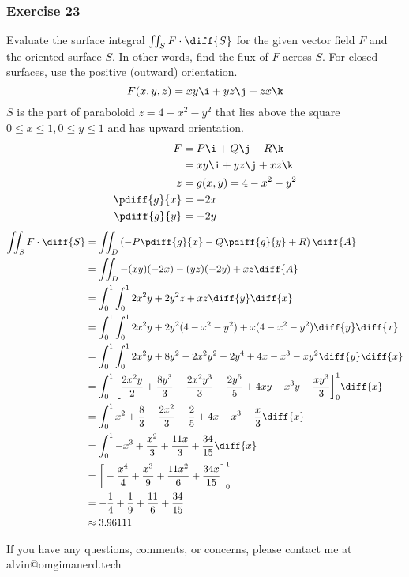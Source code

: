 \documentclass{math}
\begin{document}
\subsubsection*{Exercise 23}
Evaluate the surface integral \( \iint_{S}F\cdot\diff{S} \) for the given vector
field \( F \) and the oriented surface \( S \). In other words, find the flux of
\( F \) across \( S \). For closed surfaces, use the positive (outward)
orientation.
\[ F(x,y,z) = xy\i+yz\j+zx\k \]
\( S \) is the part of paraboloid \( z = 4-x^2-y^2 \) that lies above the square
\( 0\le x\le1,0\le y\le1 \) and has upward orientation.
\begin{align*}
  F &= P\i+Q\j+R\k \\
  &= xy\i+yz\j+xz\k \\
  z &= g(x,y) = 4-x^2-y^2 \\
  \pdiff{g}{x} &= -2x \\
  \pdiff{g}{y} &= -2y
\end{align*}
\begin{align*}
  \iint_{S}F\cdot\diff{S} &=
    \iint_{D}\left(-P\pdiff{g}{x}-Q\pdiff{g}{y}+R\right)\diff{A} \\
  &= \iint_{D}-(xy)(-2x)-(yz)(-2y)+xz\diff{A} \\
  &= \int_{0}^{1}\int_{0}^{1}2x^2y+2y^2z+xz\diff{y}\diff{x} \\
  &= \int_{0}^{1}\int_{0}^{1}2x^2y+2y^2(4-x^2-y^2)+x(4-x^2-y^2)
    \diff{y}\diff{x} \\
  &= \int_{0}^{1}\int_{0}^{1}2x^2y+8y^2-2x^2y^2-2y^4+4x-x^3-xy^2
    \diff{y}\diff{x} \\
  &= \int_{0}^{1}\bigg[\frac{2x^2y}{2}+\frac{8y^3}{3}-\frac{2x^2y^3}{3}-
    \frac{2y^5}{5}+4xy-x^3y-\frac{xy^3}{3}\bigg]_{0}^{1}\diff{x} \\
  &= \int_{0}^{1}x^2+\frac{8}{3}-\frac{2x^2}{3}-\frac{2}{5}+4x-x^3-\frac{x}{3}
    \diff{x} \\
  &= \int_{0}^{1}-x^3+\frac{x^2}{3}+\frac{11x}{3}+\frac{34}{15}\diff{x} \\
  &= \bigg[-\frac{x^4}{4}+\frac{x^3}{9}+\frac{11x^2}{6}+\frac{34x}{15}
    \bigg]_{0}^{1} \\
  &= -\frac{1}{4}+\frac{1}{9}+\frac{11}{6}+\frac{34}{15} \\
  &\approx 3.96111
\end{align*}

\begin{center}
  If you have any questions, comments, or concerns, please contact me at
  alvin@omgimanerd.tech
\end{center}
\end{document}
